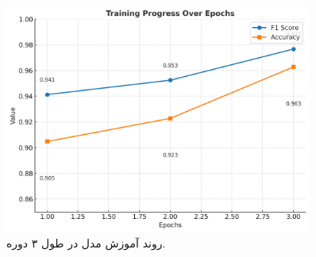 \begin{figure}[h!]
\centering
\includegraphics[width=0.9\textwidth]{images/fig_training_progress_en}
    \caption{روند آموزش مدل در طول ۳ دوره.}
\label{fig:training_progress}
\end{figure}

     
     
     
     
     
     
     
     
     
     
     
     